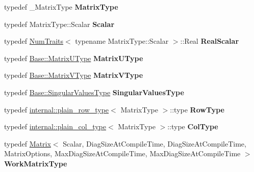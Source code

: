 \begin{DoxyCompactItemize}
\item 
\mbox{\label{group___s_v_d___module_a2b526fed1f4280249d759b09cadcfded}} 
typedef \+\_\+\+Matrix\+Type {\bfseries Matrix\+Type}
\item 
\mbox{\label{group___s_v_d___module_af8aa379704163fb6ea722beb615f0862}} 
typedef Matrix\+Type\+::\+Scalar {\bfseries Scalar}
\item 
\mbox{\label{group___s_v_d___module_a33c5cda5ab6ba0d06c567a05deff89e4}} 
typedef \hyperlink{group___core___module_struct_eigen_1_1_num_traits}{Num\+Traits}$<$ typename Matrix\+Type\+::\+Scalar $>$\+::Real {\bfseries Real\+Scalar}
\item 
\mbox{\label{group___s_v_d___module_a8b2e5e357eb839e65cee7f4d56962906}} 
typedef \hyperlink{group___core___module}{Base\+::\+Matrix\+U\+Type} {\bfseries Matrix\+U\+Type}
\item 
\mbox{\label{group___s_v_d___module_a08597d375e3ba00f089e1f3dd994739a}} 
typedef \hyperlink{group___core___module}{Base\+::\+Matrix\+V\+Type} {\bfseries Matrix\+V\+Type}
\item 
\mbox{\label{group___s_v_d___module_aa984693f000ee4bb8b97a8745ce4fc3f}} 
typedef \hyperlink{class_eigen_1_1internal_1_1_tensor_lazy_evaluator_writable}{Base\+::\+Singular\+Values\+Type} {\bfseries Singular\+Values\+Type}
\item 
\mbox{\label{group___s_v_d___module_a207a070b273d496fed8ae023dc65bc1d}} 
typedef \hyperlink{struct_eigen_1_1internal_1_1plain__row__type}{internal\+::plain\+\_\+row\+\_\+type}$<$ Matrix\+Type $>$\+::type {\bfseries Row\+Type}
\item 
\mbox{\label{group___s_v_d___module_aa0f11b5e8b126ff21937e8a08781a50d}} 
typedef \hyperlink{struct_eigen_1_1internal_1_1plain__col__type}{internal\+::plain\+\_\+col\+\_\+type}$<$ Matrix\+Type $>$\+::type {\bfseries Col\+Type}
\item 
\mbox{\label{group___s_v_d___module_a2340597ffb613aec7aeff16310d19639}} 
typedef \hyperlink{group___core___module_class_eigen_1_1_matrix}{Matrix}$<$ Scalar, Diag\+Size\+At\+Compile\+Time, Diag\+Size\+At\+Compile\+Time, Matrix\+Options, Max\+Diag\+Size\+At\+Compile\+Time, Max\+Diag\+Size\+At\+Compile\+Time $>$ {\bfseries Work\+Matrix\+Type}
\end{DoxyCompactItemize}
